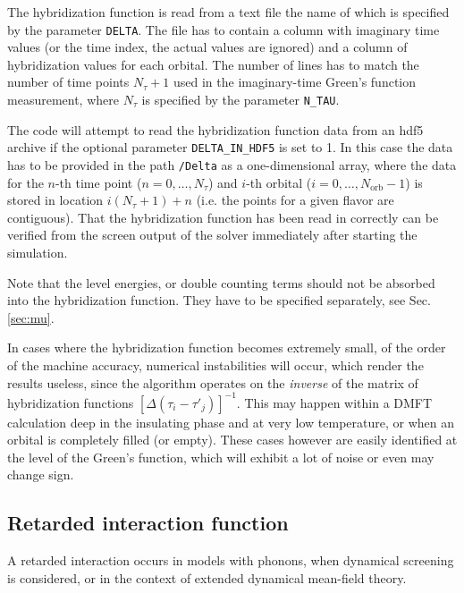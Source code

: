 \documentclass[aps,prb,floatfix,superscriptaddress,twocolumn,notitlepage]{revtex4-1}
\begin{document}
The hybridization function is read from a text file the name of which is specified by the parameter \verb#DELTA#. The file has to contain a column with imaginary time values (or the time index, the actual values are ignored) and a column of hybridization values for each orbital. The number of lines has to match the number of time points $N_{\tau}+1$ used in the imaginary-time Green's function measurement, where $N_{\tau}$ is specified by the parameter \verb#N_TAU#.

The code will attempt to read the hybridization function data from an hdf5 archive if the optional parameter \verb#DELTA_IN_HDF5# is set to 1. In this case the data has to be provided in the path \verb#/Delta# as a one-dimensional array, where the data for the $n$-th time point ($n=0,\ldots,N_{\tau}$) and $i$-th orbital ($i=0,\ldots,N_{\text{orb}}-1$) is stored in location $i(N_{\tau}+1)+n$ (i.e. the points for a given flavor are contiguous).
That the hybridization function has been read in correctly can be verified from the screen output of the solver immediately after starting the simulation.

Note that the level energies, or double counting terms should not be absorbed into the hybridization function. They have to be specified separately, see Sec. \ref{sec:mu}.

In cases where the hybridization function becomes extremely small, of the order of the machine accuracy, numerical instabilities will occur, which render the results useless, since the algorithm operates on the \emph{inverse} of the matrix of hybridization functions $[\Delta(\tau_{i}-\tau'_{j})]^{-1}$.
This may happen within a DMFT calculation deep in the insulating phase and at very low temperature, or when an orbital is completely filled (or empty).
These cases however are easily identified at the level of the Green's function, which will exhibit a lot of noise or even may change sign.

\subsection{Retarded interaction function}
\label{k_ret_int}
A retarded interaction occurs in models with phonons, when dynamical screening is considered, or in the context of extended dynamical mean-field theory.
\end{document}
